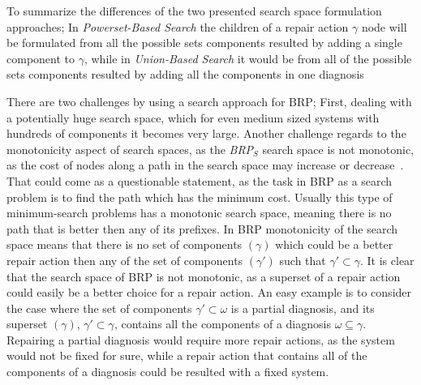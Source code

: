 \documentclass[a4paper,11pt]{report}
\newcommand\meir[1]{\textcolor{red}{meir: #1}}
\newcommand\roni[1]{\textcolor{green}{roni: #1}}
\newcommand{\brps}{\textit{BRP$_S$}}
\begin{document}
To summarize the differences of the two presented search space formulation approaches; In {\em Powerset-Based Search} the children of a repair action $\gamma$ node will be formulated from all the possible sets components resulted by adding a single component to $\gamma$, while in {\em Union-Based Search} it would be from all of the possible sets components resulted by adding all the components in one diagnosis



There are two challenges by using a search approach for BRP; First, dealing with a potentially huge search space, which for even medium sized systems with hundreds of components it becomes very large.
Another challenge regards to the monotonicity aspect of search spaces, as the \brps{} search space is not monotonic, as the cost of nodes along a path in the search space may increase or decrease~\cite{stern2014max}. 
That could come as a questionable statement, as the task in BRP as a search problem is to find the path which has the minimum cost. Usually this type of minimum-search problems has a monotonic search space, meaning there is no path that is better then any of its prefixes. In BRP monotonicity of the search space means that there is no set of components $(\gamma)$ which could be a better repair action then any of the set of components $(\gamma')$ such that ${\gamma}' \subset \gamma$. It is clear that the search space of BRP is not monotonic, as a superset of a repair action could easily be a better choice for a repair action. An easy example is to consider the case where the set of components $\gamma' \subset \omega$ is a partial diagnosis, and its superset $(\gamma)$, ${\gamma}' \subset {\gamma}$, contains all the components of a diagnosis $\omega \subseteq \gamma$. Repairing a partial diagnosis would require more repair actions, as the system would not be fixed for sure, while a repair action that contains all of the components of a diagnosis could be resulted with a fixed system.
\end{document}
